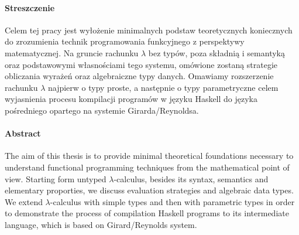 \paragraph{Streszczenie}
Celem tej pracy jest wyłożenie minimalnych podstaw teoretycznych
koniecznych do zrozumienia technik programowania funkcyjnego
z perspektywy matematycznej. Na gruncie rachunku \(\lambda\) bez typów,
poza składnią i semantyką oraz podstawowymi własnościami tego systemu,
omówione zostaną strategie obliczania wyrażeń oraz algebraiczne
typy danych. Omawiamy rozszerzenie rachunku \(\lambda\)  najpierw o typy proste,
a następnie o typy parametryczne celem wyjasnienia procesu kompilacji
programów w języku Haskell do języka pośredniego opartego na 
systemie Girarda/Reynoldsa.

\paragraph{Abstract}
The aim of this thesis is to provide minimal theoretical foundations
necessary to understand functional programming techniques from the
mathematical point of view. Starting form untyped \(\lambda\)-calculus,
besides its syntax, semantics and elementary proporties, we discuss
evaluation strategies and algebraic data types. We extend \(\lambda\)-calculus
with simple types and then with parametric types in order to demonstrate
the process of compilation Haskell programs to its intermediate language,
which is based on Girard/Reynolds system.
